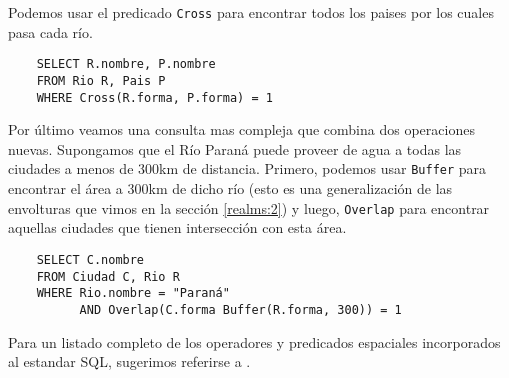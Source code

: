 Podemos usar el predicado \texttt{Cross} para encontrar todos los paises por los cuales pasa cada río.

\begin{verbatim}
    SELECT R.nombre, P.nombre
    FROM Rio R, Pais P
    WHERE Cross(R.forma, P.forma) = 1
\end{verbatim}

Por último veamos una consulta mas compleja que combina dos operaciones nuevas. Supongamos que el Río Paraná puede proveer de agua a todas las ciudades a menos de 300km de distancia. Primero, podemos usar \texttt{Buffer} para encontrar el área a 300km de dicho río (esto es una generalización de las envolturas que vimos en la sección \ref{realms:2}) y luego, \texttt{Overlap} para encontrar aquellas ciudades que tienen intersección con esta área.

\begin{verbatim}
    SELECT C.nombre
    FROM Ciudad C, Rio R
    WHERE Rio.nombre = "Paraná"
          AND Overlap(C.forma Buffer(R.forma, 300)) = 1
\end{verbatim}

Para un listado completo de los operadores y predicados espaciales incorporados al estandar SQL, sugerimos referirse a \cite{99opengis}.




